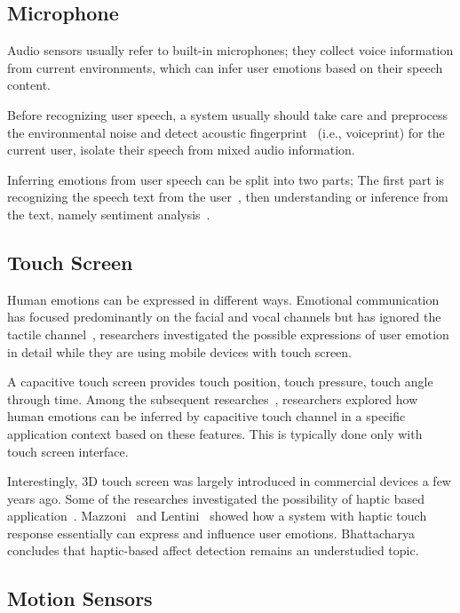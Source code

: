 \subsection{Microphone}\label{subsec:audio}
Audio sensors usually refer to built-in microphones; they collect voice information from current environments, which can infer user emotions based on their speech content.

Before recognizing user speech, a system usually should take care and preprocess the environmental noise and detect acoustic fingerprint~\cite{boles2017voice} (i.e., voiceprint) for the current user, isolate their speech from mixed audio information.

Inferring emotions from user speech can be split into two parts; The first part is recognizing the speech text from the user~\cite{mikolov2010recurrent, google2017}, then understanding or inference from the text, namely sentiment analysis~\cite{Rajalakshmi2017ACS}.

\subsection{Touch Screen}\label{subsec:touch}

Human emotions can be expressed in different ways. Emotional communication has focused predominantly on the facial and vocal channels but has ignored the tactile channel~\cite{hertenstein2009communication}, researchers investigated the possible expressions of user emotion in detail while they are using mobile devices with touch screen.

A capacitive touch screen provides touch position, touch pressure, touch angle through time. Among the subsequent researches~\cite{Gao2012, Shah2015, Mottelson2016, bhattacharya2017predictive}, researchers explored how human emotions can be inferred by capacitive touch channel in a specific application context based on these features. This is typically done only with touch screen interface.

Interestingly, 3D touch screen was largely introduced in commercial devices a few years ago. Some of the researches investigated the possibility of haptic based application~\cite{Eid2016}. Mazzoni~\cite{Mazzoni2016} and Lentini~\cite{Lentini2017} showed how a system with haptic touch response essentially can express and influence user emotions. Bhattacharya~\cite{Bhattacharya2017} concludes that haptic-based affect detection remains an understudied topic.

\subsection{Motion Sensors}\label{subsec:motion}

